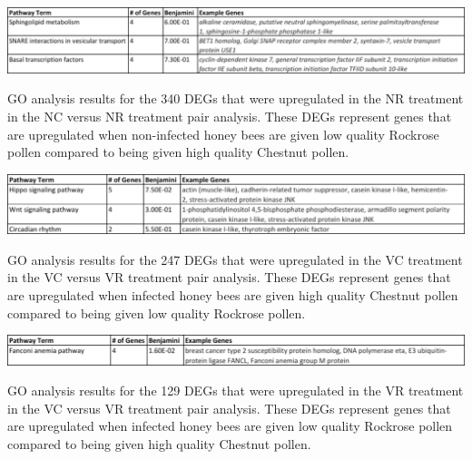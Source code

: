 \documentclass[11pt,a4paper,oldfontcommands,openany]{memoir}
\numberwithin{equation}{section} %
\begin{document}
\begin{table}[H]
  \includegraphics[width=\textwidth]{Images/NCNRNRPathways}
  \caption{GO analysis results for the 340 DEGs that were upregulated in the NR treatment in the NC versus NR treatment pair analysis. These DEGs represent genes that are upregulated when non-infected honey bees are given low quality Rockrose pollen compared to being given high quality Chestnut pollen.}
  \label{tbl:NCNRNRPathways}
\end{table}

\begin{table}[H]
  \includegraphics[width=\textwidth]{Images/VCVRVCPathways}
  \caption{GO analysis results for the 247 DEGs that were upregulated in the VC treatment in the VC versus VR treatment pair analysis. These DEGs represent genes that are upregulated when infected honey bees are given high quality Chestnut pollen compared to being given low quality Rockrose pollen.}
  \label{tbl:VCVRVCPathways}
\end{table}

\begin{table}[H]
  \includegraphics[width=\textwidth]{Images/VCVRVRPathways}
  \caption{GO analysis results for the 129 DEGs that were upregulated in the VR treatment in the VC versus VR treatment pair analysis. These DEGs represent genes that are upregulated when infected honey bees are given low quality Rockrose pollen compared to being given high quality Chestnut pollen.}
  \label{tbl:VCVRVRPathways}
\end{table}
\end{document}
